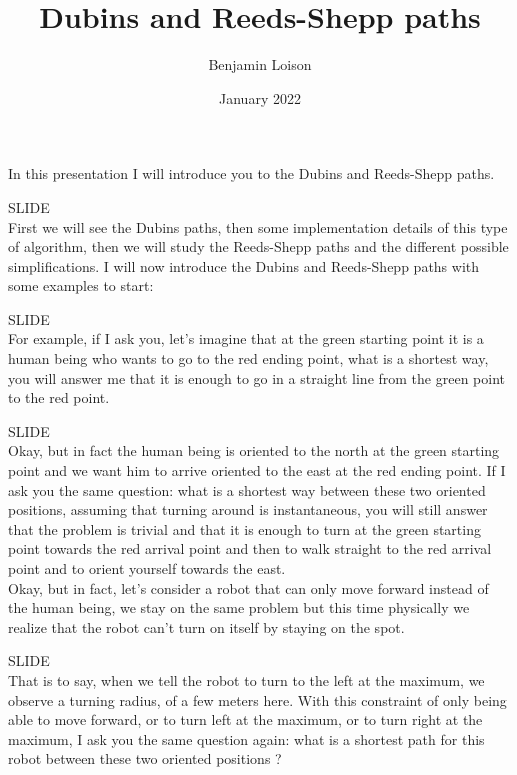 \documentclass[12pt,a4paper]{article}
\newcommand{\slide}{\vspace{0.6cm}SLIDE\\}
\begin{document}
	\title{Dubins and Reeds-Shepp paths}
	\author{Benjamin Loison}
	\date{January 2022}
	\maketitle

	\setlength{\parindent}{0cm}
	
	
	In this presentation I will introduce you to the Dubins and Reeds-Shepp paths.
	
	\slide
	
	First we will see the Dubins paths, then some implementation details of this type of algorithm, then we will study the Reeds-Shepp paths and the different possible simplifications.
	I will now introduce the Dubins and Reeds-Shepp paths with some examples to start:
	
	\slide
	
	For example, if I ask you, let's imagine that at the green starting point it is a human being who wants to go to the red ending point, what is a shortest way, you will answer me that it is enough to go in a straight line from the green point to the red point.
	
	\slide
	
	Okay, but in fact the human being is oriented to the north at the green starting point and we want him to arrive oriented to the east at the red ending point. If I ask you the same question: what is a shortest way between these two oriented positions, assuming that turning around is instantaneous, you will still answer that the problem is trivial and that it is enough to turn at the green starting point towards the red arrival point and then to walk straight to the red arrival point and to orient yourself towards the east.\\
	
	
	Okay, but in fact, let's consider a robot that can only move forward instead of the human being, we stay on the same problem but this time physically we realize that the robot can't turn on itself by staying on the spot.
	
	\slide
	
	That is to say, when we tell the robot to turn to the left at the maximum, we observe a turning radius, of a few meters here. With this constraint of only being able to move forward, or to turn left at the maximum, or to turn right at the maximum, I ask you the same question again: what is a shortest path for this robot between these two oriented positions ?
	
\end{document}

